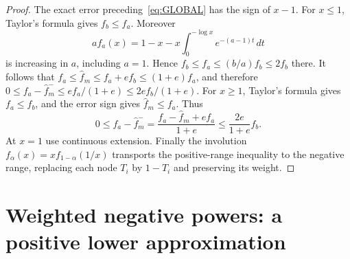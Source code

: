 \documentclass[11pt]{article}
\numberwithin{equation}{section}
\begin{document}
\begin{proof}
The exact error preceding~\eqref{eq:GLOBAL} has the sign of $x-1$.
For $x\le1$, Taylor's formula gives $f_b\le f_a$. Moreover
\[
 a f_a(x)=1-x-x\int_0^{-\log x}e^{-(a-1)t}\,dt
\]
is increasing in $a$, including $a=1$. Hence
$f_b\le f_a\le(b/a)f_b\le2f_b$ there. It follows that
$f_a\le\widehat f_m\le f_a+ef_b\le(1+e)f_a$, and therefore
$0\le f_a-\widehat f_m^-\le ef_a/(1+e)\le2ef_b/(1+e)$.
For $x\ge1$, Taylor's formula gives $f_a\le f_b$, and the error
sign gives $\widehat f_m\le f_a$. Thus
\[
 0\le f_a-\widehat f_m^-
   =\frac{f_a-\widehat f_m+ef_a}{1+e}
   \le\frac{2e}{1+e}f_b.
\]
At $x=1$ use continuous extension. Finally the involution
$f_\alpha(x)=x f_{1-\alpha}(1/x)$ transports the positive-range
inequality to the negative range, replacing each node $T_i$ by
$1-T_i$ and preserving its weight.
\end{proof}

\section{Weighted negative powers: a positive lower approximation}
\end{document}

